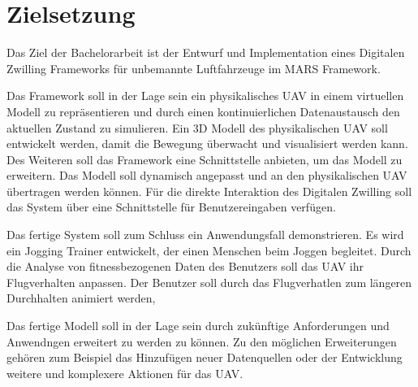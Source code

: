 \section{Zielsetzung}


Das Ziel der Bachelorarbeit ist der Entwurf und Implementation eines Digitalen Zwilling Frameworks für unbemannte Luftfahrzeuge im MARS Framework.

Das Framework soll in der Lage sein ein physikalisches UAV in einem virtuellen Modell zu repräsentieren und durch einen kontinuierlichen Datenaustausch den aktuellen Zustand zu simulieren. Ein 3D Modell des physikalischen UAV soll entwickelt werden, damit die Bewegung überwacht und visualisiert werden kann. Des Weiteren soll das Framework eine Schnittstelle anbieten, um das Modell zu erweitern. Das Modell soll dynamisch angepasst und an den physikalischen UAV übertragen werden können. Für die direkte Interaktion des Digitalen Zwilling soll das System über eine Schnittstelle für Benutzereingaben verfügen.

Das fertige System soll zum Schluss ein Anwendungsfall demonstrieren. Es wird ein Jogging Trainer entwickelt, der einen Menschen beim Joggen begleitet. Durch die Analyse von fitnessbezogenen Daten des Benutzers soll das UAV ihr Flugverhalten anpassen. Der Benutzer soll durch das Flugverhatlen zum längeren Durchhalten animiert werden, 

Das fertige Modell soll in der Lage sein durch zukünftige Anforderungen und Anwendngen erweitert zu werden zu können. Zu den möglichen Erweiterungen gehören zum Beispiel das Hinzufügen neuer Datenquellen oder der Entwicklung weitere und komplexere Aktionen für das UAV.
